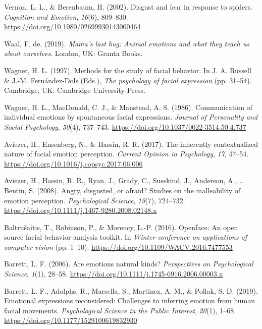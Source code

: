 \documentclass[
  english,
  doc]{apa7}
\newlength{\cslhangindent}
\newenvironment{cslreferences}%
  {\setlength{\parindent}{0pt}%
  \everypar{\setlength{\hangindent}{\cslhangindent}}\ignorespaces}%
  {\par}
\begin{document}
\begin{cslreferences}
\leavevmode\hypertarget{ref-vernon2002disgust}{}%
Vernon, L. L., \& Berenbaum, H. (2002). Disgust and fear in response to spiders. \emph{Cognition and Emotion}, \emph{16}(6), 809--830. \url{https://doi.org/10.1080/02699930143000464}

\leavevmode\hypertarget{ref-de2019mama}{}%
Waal, F. de. (2019). \emph{Mama's last hug: Animal emotions and what they teach us about ourselves}. London, UK: Granta Books.

\leavevmode\hypertarget{ref-wagner1997methods}{}%
Wagner, H. L. (1997). Methods for the study of facial behavior. In J. A. Russell \& J.-M. Fernández-Dols (Eds.), \emph{The psychology of facial expression} (pp. 31--54). Cambridge, UK: Cambridge University Press.

\leavevmode\hypertarget{ref-wagner1986communication}{}%
Wagner, H. L., MacDonald, C. J., \& Manstead, A. S. (1986). Communication of individual emotions by spontaneous facial expressions. \emph{Journal of Personality and Social Psychology}, \emph{50}(4), 737--743. \url{https://doi.org/10.1037/0022-3514.50.4.737}

\leavevmode\hypertarget{ref-aviezer2017inherently}{}%
Aviezer, H., Ensenberg, N., \& Hassin, R. R. (2017). The inherently contextualized nature of facial emotion perception. \emph{Current Opinion in Psychology}, \emph{17}, 47--54. \url{https://doi.org/10.1016/j.copsyc.2017.06.006}

\leavevmode\hypertarget{ref-aviezer2008angry}{}%
Aviezer, H., Hassin, R. R., Ryan, J., Grady, C., Susskind, J., Anderson, A., \ldots{} Bentin, S. (2008). Angry, disgusted, or afraid? Studies on the malleability of emotion perception. \emph{Psychological Science}, \emph{19}(7), 724--732. \url{https://doi.org/10.1111/j.1467-9280.2008.02148.x}

\leavevmode\hypertarget{ref-baltruvsaitis2016openface}{}%
Baltrušaitis, T., Robinson, P., \& Morency, L.-P. (2016). Openface: An open source facial behavior analysis toolkit. In \emph{Winter conference on applications of computer vision} (pp. 1--10). \url{https://doi.org/10.1109/WACV.2016.7477553}

\leavevmode\hypertarget{ref-barrett2006emotions}{}%
Barrett, L. F. (2006). Are emotions natural kinds? \emph{Perspectives on Psychological Science}, \emph{1}(1), 28--58. \url{https://doi.org/10.1111/j.1745-6916.2006.00003.x}

\leavevmode\hypertarget{ref-barrett2019emotional}{}%
Barrett, L. F., Adolphs, R., Marsella, S., Martinez, A. M., \& Pollak, S. D. (2019). Emotional expressions reconsidered: Challenges to inferring emotion from human facial movements. \emph{Psychological Science in the Public Interest}, \emph{20}(1), 1--68. \url{https://doi.org/10.1177/1529100619832930}


\end{cslreferences}
\end{document}
